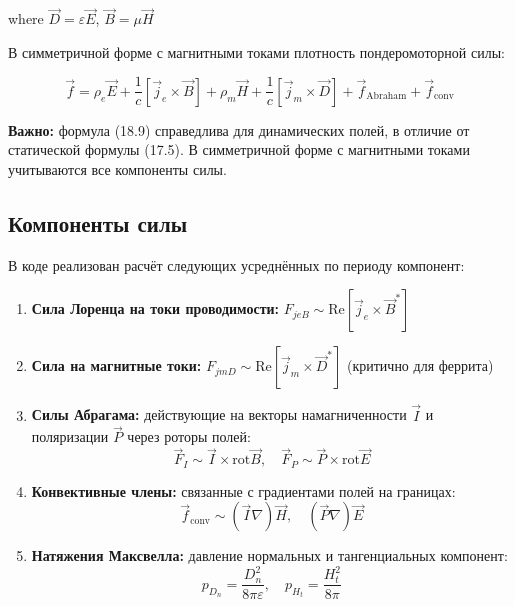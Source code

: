 \documentclass[a4paper,12pt]{article}
\begin{document}
where $\vec{D} = \varepsilon \vec{E}$, $\vec{B} = \mu \vec{H}$


В симметричной форме с магнитными токами плотность пондеромоторной силы:

\begin{equation}
\vec{f} = \rho_e \vec{E} + \frac{1}{c}[\vec{j}_e \times \vec{B}]
+ \rho_m \vec{H} + \frac{1}{c}[\vec{j}_m \times \vec{D}]
+ \vec{f}_{\text{Abraham}} + \vec{f}_{\text{conv}}
\label{eq:tamm18.9}
\end{equation}

\textbf{Важно:} формула (18.9) справедлива для динамических полей, в отличие
от статической формулы (17.5). В симметричной форме с магнитными токами
учитываются все компоненты силы.

\subsection{Компоненты силы}

В коде реализован расчёт следующих усреднённых по периоду компонент:

\begin{enumerate}
    \item \textbf{Сила Лоренца на токи проводимости:}
    $F_{jeB} \sim \text{Re}[\vec{j}_e \times \vec{B}^*]$

    \item \textbf{Сила на магнитные токи:}
    $F_{jmD} \sim \text{Re}[\vec{j}_m \times \vec{D}^*]$ (критично для феррита)

    \item \textbf{Силы Абрагама:} действующие на векторы намагниченности
    $\vec{I}$ и поляризации $\vec{P}$ через роторы полей:
    \begin{equation}
    \vec{F}_I \sim \vec{I} \times \text{rot}\vec{B}, \quad
    \vec{F}_P \sim \vec{P} \times \text{rot}\vec{E}
    \end{equation}

    \item \textbf{Конвективные члены:} связанные с градиентами полей на границах:
    \begin{equation}
    \vec{f}_{\text{conv}} \sim (\vec{I}\nabla)\vec{H}, \quad (\vec{P}\nabla)\vec{E}
    \end{equation}

    \item \textbf{Натяжения Максвелла:} давление нормальных и тангенциальных
    компонент:
    \begin{equation}
    p_{D_n} = \frac{D_n^2}{8\pi\varepsilon}, \quad
    p_{H_t} = \frac{H_t^2}{8\pi}
    \end{equation}
\end{enumerate}
\end{document}
